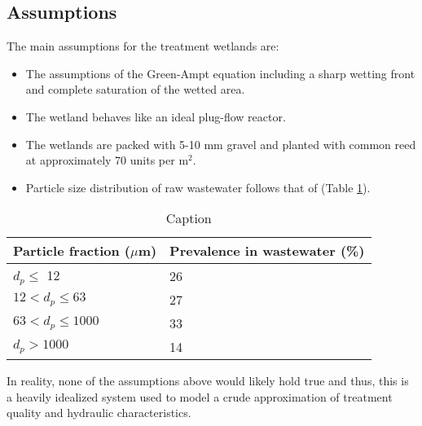 \subsection{Assumptions}
The main assumptions for the treatment wetlands are:
\begin{itemize}
    \item The assumptions of the Green-Ampt equation including a sharp wetting front and complete saturation of the wetted area.
    \item The wetland behaves like an ideal plug-flow reactor.
    \item The wetlands are packed with 5-10 mm gravel and planted with common reed at approximately 70 units per m$^2$.
    \item Particle size distribution of raw wastewater follows that of \cite{particle_size_dist} (Table \ref{tab:particle_size_dist}).
\end{itemize}
\begin{table}[ht]
    \centering
    \begin{tabular}{l|l}
    Particle fraction ($\mu$m) & Prevalence in wastewater (\%)  \\
    \hline
    $d_p \leq$ 12 & 26 \\
    $12 < d_p \leq 63$ & 27 \\
    $63 < d_p \leq 1000$ & 33 \\
    $d_p > 1000$ & 14
    \end{tabular}
    \caption{Caption}
    \label{tab:particle_size_dist}
\end{table}
In reality, none of the assumptions above would likely hold true and thus, this is a heavily idealized system used to model a crude approximation of treatment quality and hydraulic characteristics.
